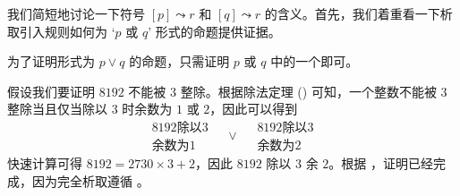 我们简短地讨论一下符号 $[p] \leadsto r$ 和 $[q] \leadsto r$ 的含义。首先，我们着重看一下析取引入规则如何为 `$p$ 或 $q$' 形式的命题提供证据。


\begin{strategy}[析取证明]
\label{strProvingDisjunctionsDirect}
为了证明形式为 $p \vee q$ 的命题，只需证明 $p$ 或 $q$ 中的一个即可。
\end{strategy}

\begin{example}
假设我们要证明 $8192$ 不能被 $3$ 整除。根据除法定理 () 可知，一个整数不能被 $3$ 整除当且仅当除以 $3$ 时余数为 $1$ 或 $2$，因此可以得到
\[
\begin{matrix} 8192 \text{除以} 3 \\ \text{余数为} 1 \end{matrix}
\quad \vee \quad
\begin{matrix} 8192 \text{除以} 3 \\ \text{余数为} 2 \end{matrix}
\]
快速计算可得 $8192 = 2730 \times 3 + 2$，因此 $8192$ 除以 $3$ 余 $2$。根据 ，证明已经完成，因为完全析取遵循 。
\end{example}

